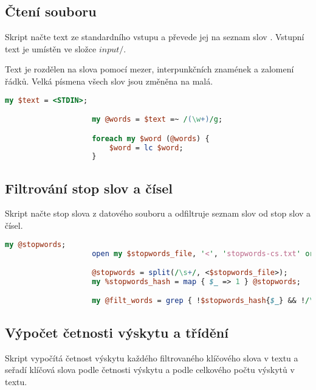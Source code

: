 \documentclass[a4paper,11pt]{article}
\begin{document}
    \hspace{10pt}
    \begin{minipage}[t]{0.5\textwidth} 
            \subsection{Čtení souboru}
                Skript načte text ze standardního vstupu a převede jej na seznam slov \cite{filter}. Vstupní text je umístěn ve složce $input/$.
                \par Text je rozdělen na slova pomocí mezer, interpunkčních znamének a zalomení řádků. Velká písmena všech slov jsou změněna na malá.
                \begin{lstlisting}[language=Perl]
                    my $text = <STDIN>;

                    my @words = $text =~ /(\w+)/g;

                    foreach my $word (@words) {
                        $word = lc $word;
                    }
                \end{lstlisting}    
                
            \subsection{Filtrování stop slov a čísel}
                Skript načte stop slova z datového souboru \cite{stopwords} a odfiltruje seznam slov od stop slov a čísel.
                \begin{lstlisting}[language=Perl]
                    my @stopwords;
                    open my $stopwords_file, '<', 'stopwords-cs.txt' or die "Cannot open stopwords-cs.txt: $!";

                    @stopwords = split(/\s+/, <$stopwords_file>);
                    my %stopwords_hash = map { $_ => 1 } @stopwords;

                    my @filt_words = grep { !$stopwords_hash{$_} && !/\d/ } @words;
                \end{lstlisting}

            \subsection{Výpočet četnosti výskytu a třídění}
                Skript vypočítá četnost výskytu každého filtrovaného klíčového slova v textu a seřadí klíčová slova podle četnosti výskytu \cite{sorting} a podle celkového počtu výskytů v textu. 
                
    \end{minipage}
\end{document}
